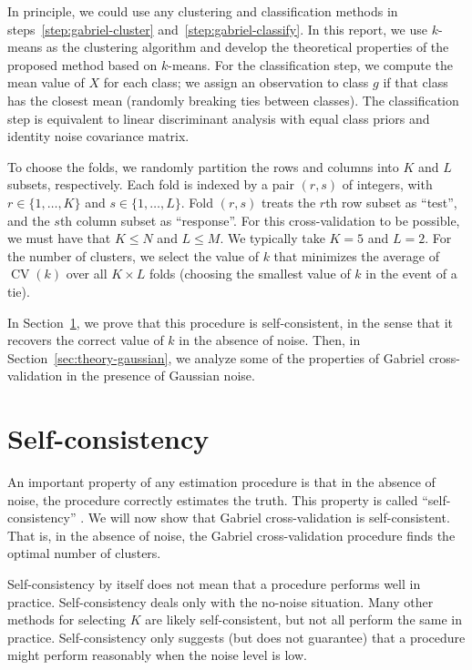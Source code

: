 \documentclass[12pt]{article}
\newcommand{\CV}{\operatorname{CV}}
\begin{document}
\noindent
In principle, we could use any clustering and classification methods in
steps~\ref{step:gabriel-cluster} and~\ref{step:gabriel-classify}.  In this
report, we use $k$-means \citep{hartigan1979algorithm} as the clustering algorithm 
and develop the theoretical properties of the proposed method based on $k$-means. 
For the classification step, we compute the mean value of $X$ for each class; we assign an
observation to class $g$ if that class has the closest mean (randomly breaking
ties between classes).  The classification step is equivalent to linear
discriminant analysis with equal class priors and identity noise covariance
matrix.



To choose the folds, we randomly partition the rows and columns into $K$ and
$L$ subsets, respectively.  Each fold is indexed by a pair $(r,s)$ of
integers, with $r \in \{1, \dotsc, K\}$ and $s \in \{1, \dotsc, L\}$.  Fold
$(r,s)$ treats the $r$th row subset as ``test'', and the $s$th column subset
as ``response''. 
For this cross-validation to be possible, we must have that
$K \leq N$ and $L \leq M$.
We typically take $K = 5$ and $L = 2$.  For the number of
clusters, we select the value of $k$ that minimizes the average of $\CV(k)$
over all $K \times L$ folds (choosing the smallest value of $k$ in the event
of a tie).




In Section~\ref{sec:self-consistent}, we prove that this procedure is
self-consistent, in the sense that it recovers the correct value of $k$ in the
absence of noise. Then, in Section~\ref{sec:theory-gaussian}, we analyze some
of the properties of Gabriel cross-validation in the presence of Gaussian
noise.


\section{Self-consistency}
\label{sec:self-consistent}

An important property of any estimation procedure is that in the absence of
noise, the procedure correctly estimates the truth. This property is called
``self-consistency'' \citep{tarpey96}. We will now show that Gabriel
cross-validation is self-consistent. That is, in the absence of noise, the
Gabriel cross-validation procedure finds the optimal number of clusters.


Self-consistency by itself does not mean that a procedure performs well in
practice. Self-consistency deals only with the no-noise situation.  Many other
methods for selecting $K$ are likely self-consistent, but not all perform the
same in practice. Self-consistency only suggests (but does not guarantee) that
a procedure might perform reasonably when the noise level is low.
\end{document}
